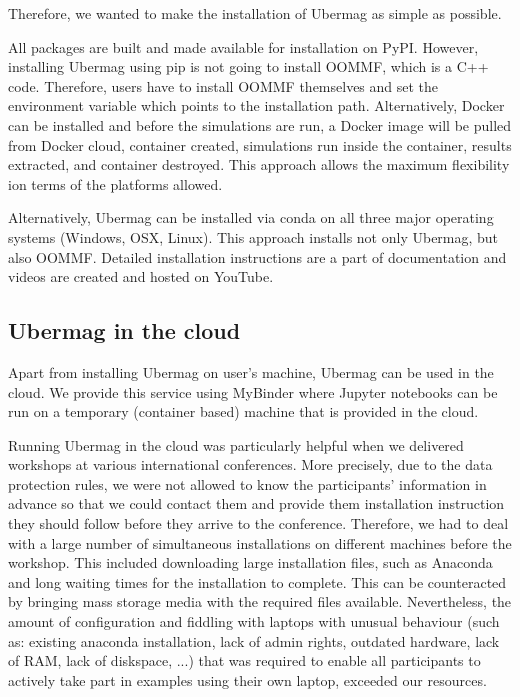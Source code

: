 \documentclass{deliverablereport}
\begin{document}
Therefore, we wanted to make the installation of Ubermag as simple as
possible.

All packages are built and made available for installation on
PyPI. However, installing Ubermag using pip is not going to install
OOMMF, which is a C++ code. Therefore, users have to install OOMMF
themselves and set the environment variable which points to the
installation path. Alternatively, Docker can be installed and before
the simulations are run, a Docker image will be pulled from Docker
cloud, container created, simulations run inside the container,
results extracted, and container destroyed. This approach allows the
maximum flexibility ion terms of the platforms allowed.

Alternatively, Ubermag can be installed via conda on all three major
operating systems (Windows, OSX, Linux). This approach installs not
only Ubermag, but also OOMMF. Detailed installation instructions are a
part of documentation and videos are created and hosted on YouTube.

\subsection{Ubermag in the cloud}

Apart from installing Ubermag on user's machine, Ubermag can be used
in the cloud. We provide this service using MyBinder where Jupyter
notebooks can be run on a temporary (container based) machine that is
provided in the cloud.

Running Ubermag in the cloud was particularly helpful when we
delivered workshops at various international conferences. More
precisely, due to the data protection rules, we were not allowed to
know the participants' information in advance so that we could contact
them and provide them installation instruction they should follow
before they arrive to the conference. Therefore, we had to deal with a
large number of simultaneous installations on different machines
before the workshop. This included downloading large installation
files, such as Anaconda and long waiting times for the installation to
complete. This can be counteracted by bringing mass storage media with
the required files available. Nevertheless, the amount of
configuration and fiddling with laptops with unusual behaviour (such
as: existing anaconda installation, lack of admin rights, outdated
hardware, lack of RAM, lack of diskspace, ...) that was required to
enable all participants to actively take part in examples using their
own laptop, exceeded our resources.
\end{document}
